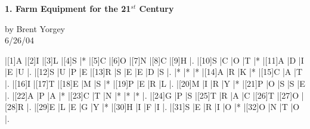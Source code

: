 \documentclass[12pt]{article}
\begin{document}
\begin{center}
{\large \textbf{1. Farm Equipment for the 21$^{st}$ Century}} \medskip

{\small by Brent Yorgey \\
  6/26/04}
\end{center}
\medskip



\begin{Puzzle}{10}{10}
  |[1]A  |[2]I  |[3]L  |[4]S  |*     |[5]C  |[6]O  |[7]N  |[8]C  |[9]H  |.
  |[10]S |C     |O     |T     |*     |[11]A |D     |I     |E     |U     |.
  |[12]S |U     |P     |E     |[13]R |S     |E     |E     |D     |S     |.
  |*     |*     |*     |[14]A |R     |K     |*     |[15]C |A     |T     |.
  |[16]I |[17]T |[18]E |M     |S     |*     |[19]P |E     |R     |L     |.
  |[20]M |I     |R     |Y     |*     |[21]P |O     |S     |S     |E     |.
  |[22]A |P     |A     |*     |[23]C |T     |N     |*     |*     |*     |.
  |[24]G |P     |S     |[25]T |R     |A     |C     |[26]T |[27]O |[28]R |.
  |[29]E |L     |E     |G     |Y     |*     |[30]H |I     |F     |I     |.
  |[31]S |E     |R     |I     |O     |*     |[32]O |N     |T     |O     |.
\end{Puzzle}
\end{document}
